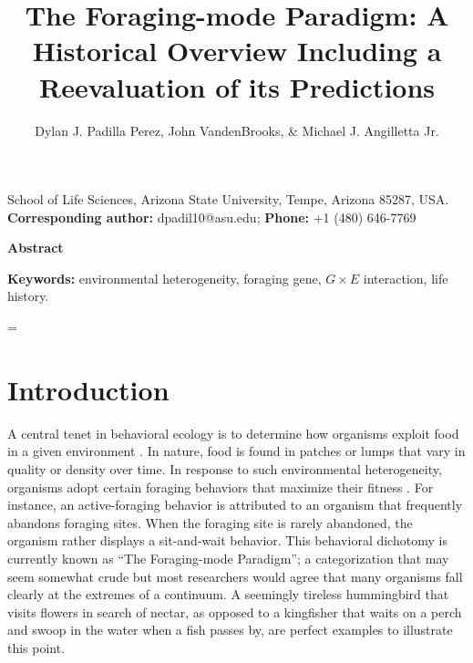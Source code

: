 \documentclass[12pt]{article}
\title{\renewcommand{\baselinestretch}{1.17}\large\bf The Foraging-mode Paradigm: A Historical Overview Including a Reevaluation of its Predictions
}
\author{\normalsize
Dylan J. Padilla Perez, John VandenBrooks, \& Michael J. Angilletta Jr.
}
\begin{document}
\date{}

\maketitle

\vspace{-0.5cm}

School of Life Sciences, Arizona State University, Tempe, Arizona 85287, USA. \vspace{6pt} \\ \textbf{Corresponding author:} dpadil10@asu.edu; \textbf{Phone:} +1 (480) 646-7769

\vspace{6pt}


\noindent
{\normalsize{\bf Abstract}
\newline

}

\medskip
\noindent
{\small{\bf Keywords:}{ environmental heterogeneity, foraging gene, $G \times E$ interaction, life history.} 


}

\baselineskip=\normalbaselineskip

\newpage
\noindent
\section*{\normalsize Introduction}

A central tenet in behavioral ecology is to determine how organisms exploit food in a given environment \citep{macarthur1966optimal}. In nature, food is found in patches or lumps that vary in quality or density over time. In response to such environmental heterogeneity, organisms adopt certain foraging behaviors that maximize their fitness \citep{schoener1969models}. For instance, an active-foraging behavior is attributed to an organism that frequently abandons foraging sites. When the foraging site is rarely abandoned, the organism rather displays a sit-and-wait behavior. This behavioral dichotomy is currently known as ``The Foraging-mode Paradigm''; a categorization that may seem somewhat crude but most researchers would agree that many organisms fall clearly at the extremes of a continuum. A seemingly tireless hummingbird that visits flowers in search of nectar, as opposed to a kingfisher that waits on a perch and swoop in the water when a fish passes by, are perfect examples to illustrate this point.
\end{document}
